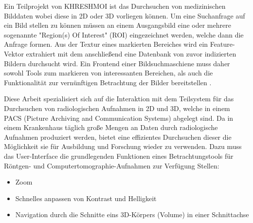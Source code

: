 Ein Teilprojekt von KHRESHMOI ist das Durchsuchen von medizinischen Bilddaten wobei diese in 2D oder 3D vorliegen können.
Um eine Suchanfrage auf ein Bild stellen zu können müssen an einem Ausgangsbild eine oder mehrere sogenannte "Region(s) Of Interest" (ROI) eingezeichnet werden, welche dann die Anfrage formen.
Aus der Textur eines markierten Bereiches wird ein Feature-Vektor extrahiert mit dem anschließend eine Datenbank von zuvor indizierten Bildern durchsucht wird.
%
Ein Frontend einer Bildsuchmaschiene muss daher sowohl Tools zum markieren von interessanten Bereichen, 
als auch die Funktionalität zur vernünftigen Betrachtung der Bilder bereitstellen \cite{kres}.

Diese Arbeit spezialisiert sich auf die Interaktion mit dem Teilsystem für das Durchsuchen von radiologischen Aufnahmen in 2D und 3D,
welche in einem PACS (Picture Archiving and Communication Systems) abgelegt sind.
Da in einem Krankenhaus täglich große Mengen an Daten durch radiologische Aufnahmen produziert werden, 
bietet eine effizientes Durchsuchen dieser die Möglichkeit  sie für Ausbildung und Forschung wieder zu verwenden.
%
Dazu muss das User-Interface die grundlegenden Funktionen eines Betrachtungstools für Röntgen- und Computertomographie-Aufnahmen zur Verfügung Stellen:
\begin{itemize}
	\item Zoom
	\item Schnelles anpassen von Kontrast und Helligkeit
	\item Navigation durch die Schnitte eins 3D-Körpers (Volume) in einer Schnittachse
\end{itemize}
\cite{pacs}


